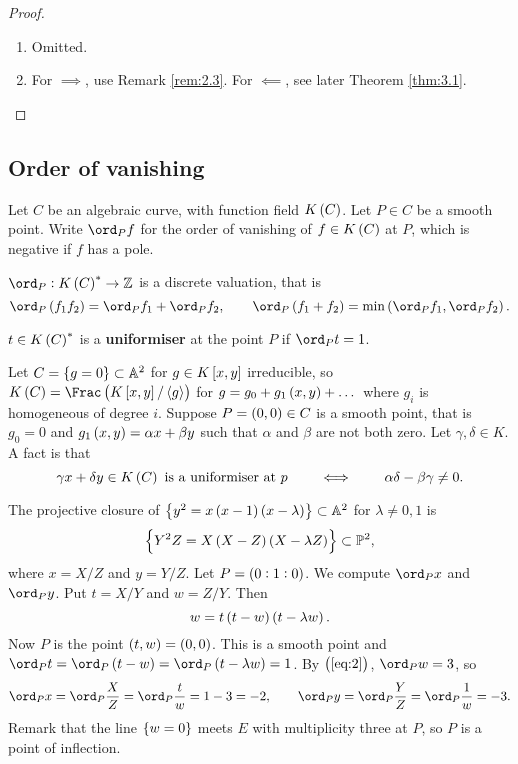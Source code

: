 \begin{proof}
\hfill
\begin{enumerate}
\item Omitted.
\item For $ \implies $, use Remark \ref{rem:2.3}. For $ \impliedby $, see later Theorem \ref{thm:3.1}.
\end{enumerate}
\end{proof}

\subsection{Order of vanishing}

Let $ C $ be an algebraic curve, with function field $ K\br{C} $. Let $ P \in C $ be a smooth point. Write $ \ord_P f $ for the order of vanishing of $ f \in K\br{C} $ at $ P $, which is negative if $ f $ has a pole.

\begin{fact*}
$ \ord_P : K\br{C}^* \to \ZZ $ is a discrete valuation, that is
$$ \ord_P \br{f_1f_2} = \ord_P f_1 + \ord_P f_2, \qquad \ord_P \br{f_1 + f_2} = \min\br{\ord_P f_1, \ord_P f_2}. $$
\end{fact*}

\begin{definition*}
$ t \in K\br{C}^* $ is a \textbf{uniformiser} at the point $ P $ if $ \ord_P t = 1 $.
\end{definition*}

\pagebreak

\begin{example}
Let $ C = \cbr{g = 0} \subset \AA^2 $ for $ g \in K\sbr{x, y} $ irreducible, so $ K\br{C} = \Frac \br{K\sbr{x, y} / \abr{g}} $ for $ g = g_0 + g_1\br{x, y} + \dots $ where $ g_i $ is homogeneous of degree $ i $. Suppose $ P = \br{0, 0} \in C $ is a smooth point, that is $ g_0 = 0 $ and $ g_1\br{x, y} = \alpha x + \beta y $ such that $ \alpha $ and $ \beta $ are not both zero. Let $ \gamma, \delta \in K $. A fact is that
$$ \gamma x + \delta y \in K\br{C} \ \text{is a uniformiser at} \ p \qquad \iff \qquad \alpha\delta - \beta\gamma \ne 0. $$
\end{example}

\begin{example}
\label{eg:2.6}
The projective closure of $ \cbr{y^2 = x\br{x - 1}\br{x - \lambda}} \subset \AA^2 $ for $ \lambda \ne 0, 1 $ is
$$ \cbr{Y^2Z = X\br{X - Z}\br{X - \lambda Z}} \subset \PP^2, $$
where $ x = X / Z $ and $ y = Y / Z $. Let $ P = \br{0 : 1 : 0} $. We compute $ \ord_P x $ and $ \ord_P y $. Put $ t = X / Y $ and $ w = Z / Y $. Then
\begin{equation}
\label{eq:2}
w = t\br{t - w}\br{t - \lambda w}.
\end{equation}
Now $ P $ is the point $ \br{t, w} = \br{0, 0} $. This is a smooth point and $ \ord_P t = \ord_P \br{t - w} = \ord_P \br{t - \lambda w} = 1 $. By $ \br{\ref{eq:2}} $, $ \ord_P w = 3 $, so
$$ \ord_P x = \ord_P \dfrac{X}{Z} = \ord_P \dfrac{t}{w} = 1 - 3 = -2, \qquad \ord_P y = \ord_P \dfrac{Y}{Z} = \ord_P \dfrac{1}{w} = -3. $$
Remark that the line $ \cbr{w = 0} $ meets $ E $ with multiplicity three at $ P $, so $ P $ is a point of inflection.
\end{example}

